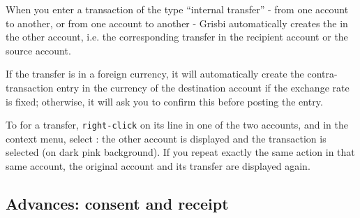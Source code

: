 When you enter a transaction of the type \enquote{internal transfer} - from one account to another, or from one account to another - Grisbi automatically creates the  in the other account, i.e. the corresponding transfer in the recipient account or the source account.

If the transfer is in a foreign currency, it will automatically create the contra-transaction entry in the currency of the destination account if the exchange rate is fixed; otherwise, it will ask you to confirm this before posting the entry.

To  for a transfer, \texttt{right-click} on its line in one of the two accounts, and in the context menu, select : the other account is displayed and the transaction is selected (on \colorbox[RGB]{245,155,155}{dark pink background}). If you repeat exactly the same action in that same account, the original account and its transfer are displayed again.


\subsection{Advances: consent and receipt\label{transactions-new-advance}}

